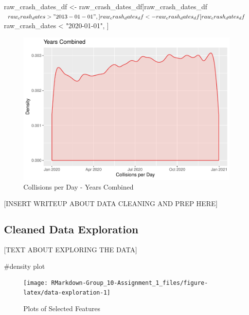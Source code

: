 \begin{Schunk}
\begin{Sinput}
raw_crash_dates_df <- raw_crash_dates_df[raw_crash_dates_df$raw_crash_dates > "2013-01-01", ]
raw_crash_dates_df <- raw_crash_dates_df[raw_crash_dates_df$raw_crash_dates < "2020-01-01", ]
\end{Sinput}
\end{Schunk}

\begin{Schunk}
\begin{figure}

{\centering \includegraphics{RMarkdown-Group_10-Assignment_1_files/figure-latex/unnamed-chunk-6-1} 

}

\caption[Collisions per Day - Years Combined]{Collisions per Day - Years Combined}\label{fig:unnamed-chunk-6}
\end{figure}
\end{Schunk}

{[}INSERT WRITEUP ABOUT DATA CLEANING AND PREP HERE{]}

\hypertarget{cleaned-data-exploration}{%
\subsection{Cleaned Data Exploration}\label{cleaned-data-exploration}}

{[}TEXT ABOUT EXPLORING THE DATA{]}

\#density plot

\begin{Schunk}
\begin{figure}

{\centering \texttt{[image: RMarkdown-Group\_10-Assignment\_1\_files/figure-latex/data-exploration-1]} 

}

\caption[Plots of Selected Features]{Plots of Selected Features}\label{fig:data-exploration}
\end{figure}
\end{Schunk}

